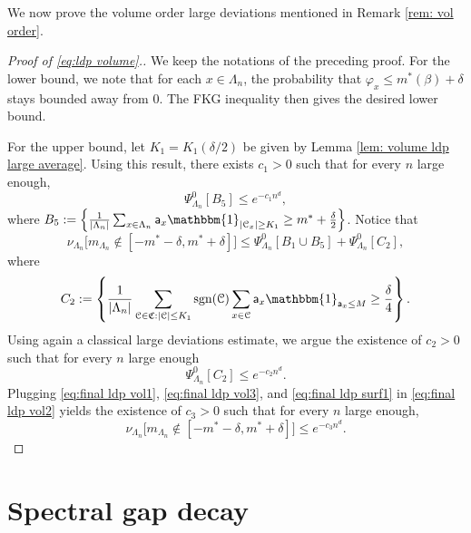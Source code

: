 \documentclass[11pt,a4paper]{article}
\theoremstyle{definition}
\numberwithin{equation}{section}
\begin{document}
We now prove the volume order large deviations mentioned in Remark \ref{rem: vol order}.
\begin{proof}[Proof of \textup{\eqref{eq:ldp volume}}.]
We keep the notations of the preceding proof. For the lower bound, we note that for each $x\in \Lambda_n$, the probability that $\varphi_x\leq m^*(\beta)+\delta$ stays bounded away from $0$. The FKG inequality then gives the desired lower bound.

For the upper bound, let $K_1=K_1(\delta/2)$ be given by Lemma \ref{lem: volume ldp large average}. Using this result, there exists $c_1>0$ such that for every $n$ large enough,
\begin{equation}\label{eq:final ldp vol1}
    \Psi^0_{\Lambda_n}\left[B_5\right]\leq e^{-c_1n^d},
\end{equation}
where $B_5:=\left\{\tfrac{1}{|\Lambda_n|}\sum_{x\in \Lambda_n}\mathsf{a}_x\mathbbm{1}_{|\mathcal{C}_x|\geq K_1}\geq m^*+\frac{\delta}{2}\right\}$. Notice that
\begin{equation}\label{eq:final ldp vol2}
    \nu_{\Lambda_n}\Big[m_{\Lambda_n}\notin [-m^*-\delta,m^*+\delta]\Big]\leq \Psi^0_{\Lambda_n}\left[B_1\cup B_5\right]+\Psi^0_{\Lambda_n}[C_2],
\end{equation}
where
\begin{equation}
    C_2:=\left\{\frac{1}{|\Lambda_n|}\sum_{\mathcal{C}\in \mathfrak{C}:|\mathcal{C}|\leq K_1}\text{sgn}(\mathcal{C})\sum_{x\in \mathcal{C}}\mathsf{a}_x\mathbbm{1}_{\mathsf{a}_x\leq M}\geq\frac{\delta}{4}\right\}.
\end{equation}
Using again a classical large deviations estimate, we argue the existence of $c_2>0$ such that for every $n$ large enough
\begin{equation}\label{eq:final ldp vol3}
    \Psi^0_{\Lambda_n}[C_2]\leq e^{-c_2n^d}.
\end{equation}
Plugging \eqref{eq:final ldp vol1}, \eqref{eq:final ldp vol3}, and \eqref{eq:final ldp surf1} in \eqref{eq:final ldp vol2} yields the existence of $c_3>0$ such that for every $n$ large enough,
\begin{equation}
    \nu_{\Lambda_n}\Big[m_{\Lambda_n}\notin [-m^*-\delta,m^*+\delta]\Big]\leq e^{-c_3n^d}.
\end{equation}
\end{proof}

\section{Spectral gap decay}\label{section:spectral gap}
\end{document}
